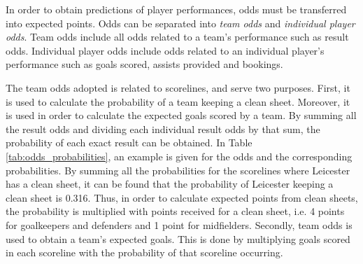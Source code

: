 \newpar

In order to obtain predictions of player performances, odds must be transferred into expected points. Odds can be separated into \textit{team odds} and \textit{individual player odds}. Team odds include all odds related to a team's performance such as result odds. Individual player odds include odds related to an individual player's performance such as goals scored, assists provided and bookings. 

\newpar

The team odds adopted is related to scorelines, and serve two purposes. First, it is used to calculate the probability of a team keeping a clean sheet. Moreover, it is used in order to calculate the expected goals scored by a team. By summing all the result odds and dividing each individual result odds by that sum, the probability of each exact result can be obtained. In Table \ref{tab:odds_probabilities}, an example is given for the odds and the corresponding probabilities. By summing all the probabilities for the scorelines where Leicester has a clean sheet, it can be found that the probability of Leicester keeping a clean sheet is 0.316. Thus, in order to calculate expected points from clean sheets, the probability is multiplied with points received for a clean sheet, i.e. 4 points for goalkeepers and defenders and 1 point for midfielders. Secondly, team odds is used to obtain a team's expected goals. This is done by multiplying goals scored in each scoreline with the probability of that scoreline occurring.

